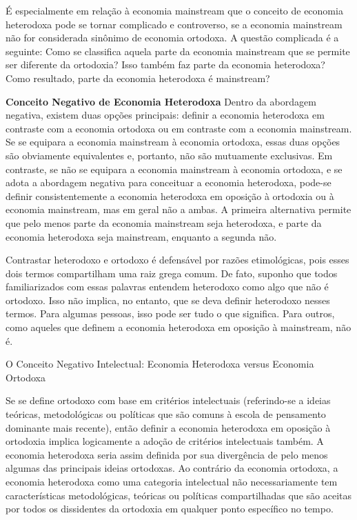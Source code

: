 \documentclass[12pt]{article}
\begin{document}
É especialmente em relação à economia mainstream que o conceito de economia heterodoxa pode se tornar complicado e controverso, se a economia mainstream não for considerada sinônimo de economia ortodoxa. A questão complicada é a seguinte: Como se classifica aquela parte da economia mainstream que se permite ser diferente da ortodoxia? Isso também faz parte da economia heterodoxa? Como resultado, parte da economia heterodoxa é mainstream?

\textbf{Conceito Negativo de Economia Heterodoxa
}
Dentro da abordagem negativa, existem duas opções principais: definir a economia heterodoxa em contraste com a economia ortodoxa ou em contraste com a economia mainstream. Se se equipara a economia mainstream à economia ortodoxa, essas duas opções são obviamente equivalentes e, portanto, não são mutuamente exclusivas. Em contraste, se não se equipara a economia mainstream à economia ortodoxa, e se adota a abordagem negativa para conceituar a economia heterodoxa, pode-se definir consistentemente a economia heterodoxa em oposição à ortodoxia ou à economia mainstream, mas em geral não a ambas. A primeira alternativa permite que pelo menos parte da economia mainstream seja heterodoxa, e parte da economia heterodoxa seja mainstream, enquanto a segunda não.

Contrastar heterodoxo e ortodoxo é defensável por razões etimológicas, pois esses dois termos compartilham uma raiz grega comum. De fato, suponho que todos familiarizados com essas palavras entendem heterodoxo como algo que não é ortodoxo. Isso não implica, no entanto, que se deva definir heterodoxo nesses termos. Para algumas pessoas, isso pode ser tudo o que significa. Para outros, como aqueles que definem a economia heterodoxa em oposição à mainstream, não é.

O Conceito Negativo Intelectual: Economia Heterodoxa versus Economia Ortodoxa

Se se define ortodoxo com base em critérios intelectuais (referindo-se a ideias teóricas, metodológicas ou políticas que são comuns à escola de pensamento dominante mais recente), então definir a economia heterodoxa em oposição à ortodoxia implica logicamente a adoção de critérios intelectuais também. A economia heterodoxa seria assim definida por sua divergência de pelo menos algumas das principais ideias ortodoxas. Ao contrário da economia ortodoxa, a economia heterodoxa como uma categoria intelectual não necessariamente tem características metodológicas, teóricas ou políticas compartilhadas que são aceitas por todos os dissidentes da ortodoxia em qualquer ponto específico no tempo.
\end{document}
